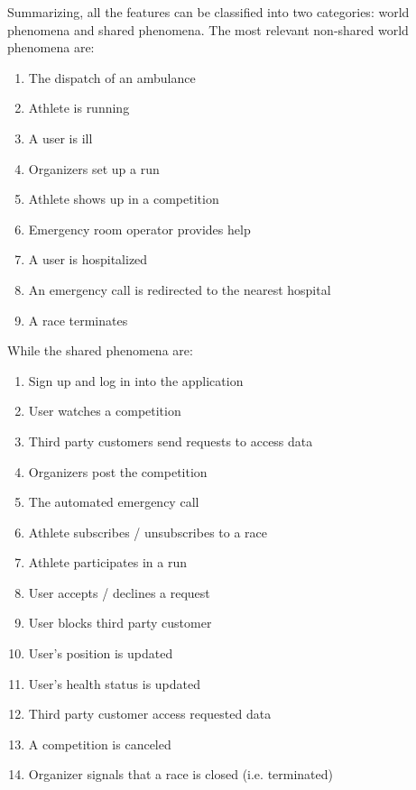 Summarizing, all the features can be classified into two categories: world phenomena and shared phenomena. 
The most relevant non-shared world phenomena are:
\begin{enumerate}
\item The dispatch of an ambulance
\item Athlete is running 
\item A user is ill
\item Organizers set up a run 
\item Athlete shows up in a competition
\item Emergency room operator provides help
\item A user is hospitalized
\item An emergency call is redirected to the nearest hospital 
\item A race terminates 
\end{enumerate}
While the shared phenomena are:
\begin{enumerate}
\item Sign up and log in into the application
\item User watches a competition
\item Third party customers send requests to access data
\item Organizers post the competition
\item The automated emergency call
\item Athlete subscribes / unsubscribes to a race
\item Athlete participates in a run
\item User accepts / declines a request
\item User blocks third party customer 
\item User's position is updated
\item User's health status is updated 
\item Third party customer access requested data
\item A competition is canceled 
\item Organizer signals that a race is closed (i.e. terminated)
\end{enumerate}
